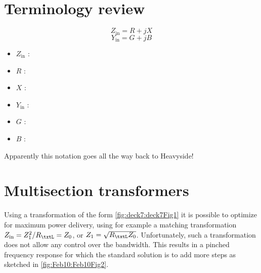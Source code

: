 
\section{Terminology review}

\begin{equation}\label{eqn:uwavesDeck7MultisectionTransformersCore:20}
Z_{\textrm{in}} = R + j X
\end{equation}
\begin{equation}\label{eqn:uwavesDeck7MultisectionTransformersCore:40}
Y_{\textrm{in}} = G + j B
\end{equation}

\begin{itemize}
\item \( Z_{\textrm{in}} \) : 
\item \( R \) : 
\item \( X \) : 
\item \( Y_{\textrm{in}} \) : 
\item \( G \) : 
\item \( B \) : 
\end{itemize}

Apparently this notation goes all the way back to Heavyside!

\section{Multisection transformers}

Using a transformation of the form \cref{fig:deck7:deck7Fig1} it is possible to optimize for maximum power delivery, using for example a matching transformation \( Z_{\textrm{in}} = Z_1^2/R_\txtL = Z_0\), or \( Z_1 = \sqrt{R_\txtL Z_0} \).  Unfortunately, such a transformation does not allow any control over the bandwidth.  This results in a pinched frequency response for which the standard solution is to add more steps as sketched in \cref{fig:Feb10:Feb10Fig2}.




